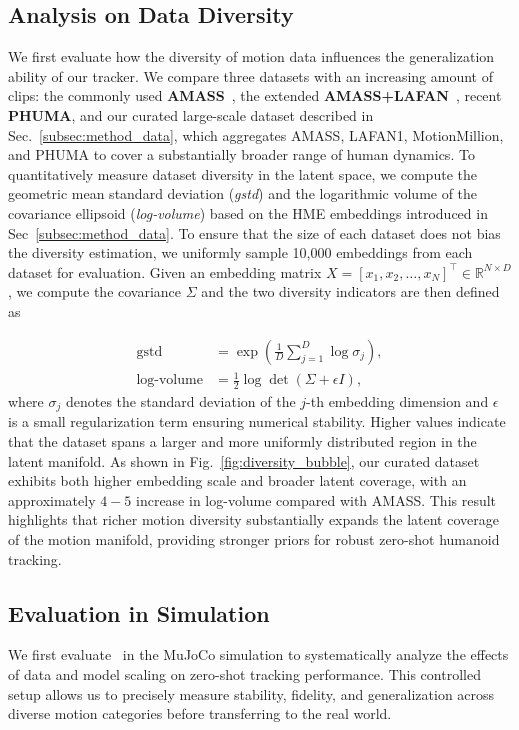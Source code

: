 \subsection{Analysis on Data Diversity}
We first evaluate how the diversity of motion data influences the generalization ability of our tracker. We compare three datasets with an increasing amount of clips: the commonly used \textbf{AMASS}~\citep{amass19}, the extended \textbf{AMASS+LAFAN}~\citep{lafan20}, recent \textbf{PHUMA}\citep{phuma25}, and our curated large-scale dataset described in Sec.~\ref{subsec:method_data}, which aggregates AMASS, LAFAN1, MotionMillion, and PHUMA to cover a substantially broader range of human dynamics. To quantitatively measure dataset diversity in the latent space, we compute the geometric mean standard deviation (\textit{gstd}) and the logarithmic volume of the covariance ellipsoid (\textit{log-volume}) based on the HME embeddings introduced in Sec~\ref{subsec:method_data}. To ensure that the size of each dataset does not bias the diversity estimation, we uniformly sample 10{,}000 embeddings from each dataset for evaluation. Given an embedding matrix $X = [x_1, x_2, \dots, x_N]^\top \in \mathbb{R}^{N \times D}$, we compute the covariance $\Sigma$ and the two diversity indicators are then defined as

\begin{equation}
\begin{aligned}
    \text{gstd} &= \exp\!\left( \frac{1}{D} \sum_{j=1}^{D} \log \sigma_j \right), \\
    \text{log-volume} &= \tfrac{1}{2}\log\det(\Sigma + \epsilon I),
\end{aligned}
\end{equation}
where $\sigma_j$ denotes the standard deviation of the $j$-th embedding dimension and $\epsilon$ is a small regularization term ensuring numerical stability. Higher values indicate that the dataset spans a larger and more uniformly distributed region in the latent manifold. As shown in Fig.~\ref{fig:diversity_bubble}, our curated dataset exhibits both higher embedding scale and broader latent coverage, with an approximately $4\!-\!5$ increase in log-volume compared with AMASS. This result highlights that richer motion diversity substantially expands the latent coverage of the motion manifold, providing stronger priors for robust zero-shot humanoid tracking.


\subsection{Evaluation in Simulation}
We first evaluate \methodname\ in the MuJoCo simulation to systematically analyze the effects of data and model scaling on zero-shot tracking performance. 
This controlled setup allows us to precisely measure stability, fidelity, 
and generalization across diverse motion categories before transferring to the real world.

